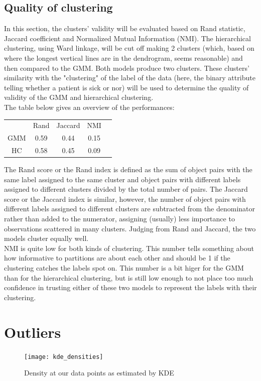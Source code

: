 \subsection{Quality of clustering}
In this section, the clusters' validity will be evaluated based on Rand statistic,
Jaccard coefficient and Normalized Mutual Information (NMI). The hierarchical clustering,
using Ward linkage, will be cut off making 2 clusters (which, based on where the
longest vertical lines are in the dendrogram, seems reasonable) and then
compared to the GMM. Both models produce two clusters. These clusters' similarity
with the "clustering" of the label of the data (here, the binary attribute telling
whether a patient is sick or nor) will be used to determine the quality of validity
of the GMM and hierarchical clustering.\\
 The table below gives an overview of the performances:\\
\begin{table}[h]
\centering
\begin{tabular}{ccccc}
    & Rand & Jaccard & NMI\\
GMM & 0.59 & 0.44 & 0.15 \\
HC & 0.58 & 0.45 & 0.09 \\
\end{tabular}
\end{table}

The Rand score or the Rand index is defined as the sum of object pairs with
the same label assigned to the same cluster and object pairs with different
labels assigned to different clusters divided by the total number of pairs. The
Jaccard score or the Jaccard index is similar, however, the number of object
pairs with different labels assigned to different clusters are subtracted from
the denominator rather than added to the numerator, assigning (usually) less
importance to observations scattered in many clusters. Judging from Rand and
Jaccard, the two models cluster equally well.\\
NMI is quite low for both kinds of clustering. This number tells something about
how informative to partitions are about each other and should be 1 if the clustering
catches the labels spot on. This number is a bit higer for the GMM than for the hierarchical
clustering, but is still low enough to not place too much confidence in trusting either
of these two models to represent the labels with their clustering.

\section{Outliers}
\begin{figure}[htb]
  \centering
  \texttt{[image: kde\_densities]}
  \caption{Density at our data points as estimated by KDE}
  \label{fig:kde}
\end{figure}

